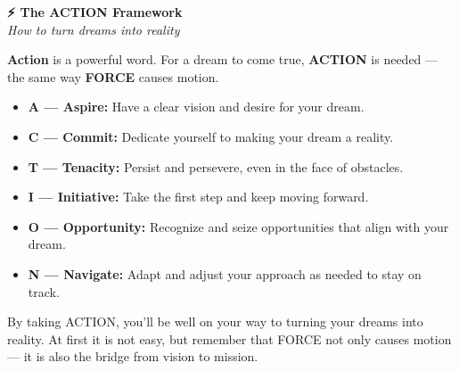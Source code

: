 \documentclass[11pt,a4paper]{article}
\begin{document}
\vspace{1em}

\begin{mindsetbox}
    \textbf{\color{primary}\Large ⚡ The ACTION Framework}\\[0.3em]
    {\color{textGray}\itshape How to turn dreams into reality}

    \vspace{1em}

    \textbf{Action} is a powerful word. For a dream to come true, \textbf{ACTION} is needed --- the same way \textbf{FORCE} causes motion.

    \vspace{1em}

    \begin{itemize}[leftmargin=1.5em, itemsep=0.5em]
        \item \textbf{\color{primary}A --- Aspire:} Have a clear vision and desire for your dream.
        \item \textbf{\color{primary}C --- Commit:} Dedicate yourself to making your dream a reality.
        \item \textbf{\color{primary}T --- Tenacity:} Persist and persevere, even in the face of obstacles.
        \item \textbf{\color{primary}I --- Initiative:} Take the first step and keep moving forward.
        \item \textbf{\color{primary}O --- Opportunity:} Recognize and seize opportunities that align with your dream.
        \item \textbf{\color{primary}N --- Navigate:} Adapt and adjust your approach as needed to stay on track.
    \end{itemize}

    \vspace{1em}

    By taking ACTION, you'll be well on your way to turning your dreams into reality. At first it is not easy, but remember that FORCE not only causes motion --- it is also the bridge from vision to mission.
\end{mindsetbox}
\end{document}
